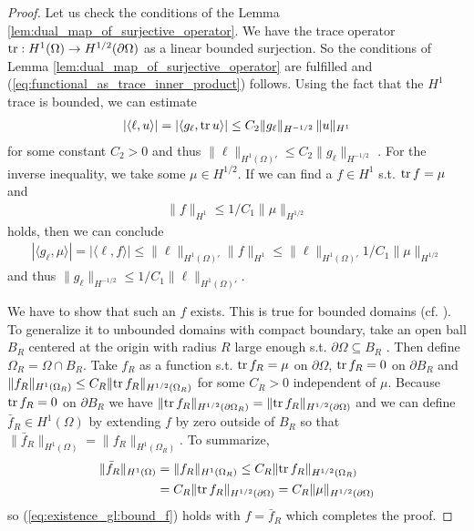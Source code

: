 \documentclass[../master_thesis.tex]{subfiles}
\begin{document}
\begin{proof}
    Let us check the conditions of the Lemma \ref{lem:dual_map_of_surjective_operator}. 
    We have the trace operator 
    $\operatorname{tr}: H^1(\Omega) \rightarrow H^{1/2}(\partial \Omega)$ as a 
    linear bounded surjection. So the conditions of 
    Lemma \ref{lem:dual_map_of_surjective_operator} are fulfilled 
    and (\ref{eq:functional_as_trace_inner_product}) follows.
    Using the fact that the $H^1$ trace is bounded, we can estimate 
    \begin{align*}
        |\langle \ell, u \rangle| = |\langle g_\ell, \operatorname{tr} u \rangle|
        \leq C_2 \lVert g_\ell \rVert _{H^{-1/2}} \, \lVert u \rVert _{H^1} 
    \end{align*}
    for some constant $C_2>0$
    and thus $\lVert \ell \rVert _{H^1(\Omega)'} \leq C_2 \lVert g_\ell \rVert _{H^{-1/2}}$ . 
    For the inverse inequality,
    we take some $\mu \in H^{1/2}$. If we can find a $f \in H^1$ s.t. $\operatorname{tr} f = \mu$ and 
    \begin{align}
        \lVert f \rVert _{H^1} \leq 1/C_1 \lVert \mu \rVert _{H^{1/2}}\label{eq:existence_gl:bound_f}
    \end{align}
    holds, then we can conclude
    \begin{align*}
        |\langle g_\ell, \mu \rangle| = |\langle \ell, f \rangle|
        \leq \lVert \ell \rVert _{H^1(\Omega)'} \lVert f \rVert _{H^1}
        \leq \lVert \ell \rVert _{H^1(\Omega)'} 1/C_1 \lVert \mu \rVert _{H^{1/2}}
    \end{align*}
    and thus $\lVert g_\ell \rVert _{H^{-1/2}} \leq 1/C_1 \lVert \ell \rVert _{H^1(\Omega)'}$.

    We have to show that such an $f$ exists. This is true for bounded domains (cf. \cite[Thm.\,3.10]{ern_guermond}).
    To generalize it to unbounded domains with compact boundary, take an open ball $B_R$ centered at the 
    origin with radius $R$ large enough s.t. $\partial \Omega \subseteq B_R$ . 
    Then define 
    $\Omega_R = \Omega \cap B_R$.
    Take $f_R$ as a function s.t. $\operatorname{tr} f_R = \mu$ on $\partial \Omega$,  
    $\operatorname{tr} f_R = 0$ on $\partial B_R$ and 
    $\lVert f_R \rVert _{H^1(\Omega_R)} \leq C_R \lVert \operatorname{tr} f_R \rVert _{H^{1/2}(\Omega_R)}$
    for some $C_R > 0$ independent of $\mu$. 
    Because $\operatorname{tr} f_R = 0$ on $\partial B_R$ 
    we have $\lVert \operatorname{tr} f_R \rVert _{H^{1/2}(\partial \Omega_R)} 
    = \lVert \operatorname{tr} f_R \rVert _{H^{1/2}(\partial \Omega)}$
    and we can define $\bar{f}_R \in H^1(\Omega)$ by 
    extending $f$ by zero outside of $B_R$ so that 
    $\lVert \bar{f}_R \rVert _{H^1(\Omega)} = \lVert f_R \rVert _{H^1(\Omega_R)}$.
    To summarize,
    \begin{align*}
        \lVert \bar{f}_R \rVert _{H^1(\Omega)} &= \lVert f_R \rVert _{H^1(\Omega_R)} 
        \leq C_R \lVert \operatorname{tr} f_R \rVert _{H^{1/2}(\Omega_R)}
        \\ &= C_R \lVert \operatorname{tr} f_R \rVert _{H^{1/2}(\partial \Omega)}
        = C_R \lVert \mu \rVert _{H^{1/2}(\partial \Omega)}
    \end{align*}
    so (\ref{eq:existence_gl:bound_f}) holds with $f = \bar{f}_R$ which completes the proof.
\end{proof}
\end{document}
